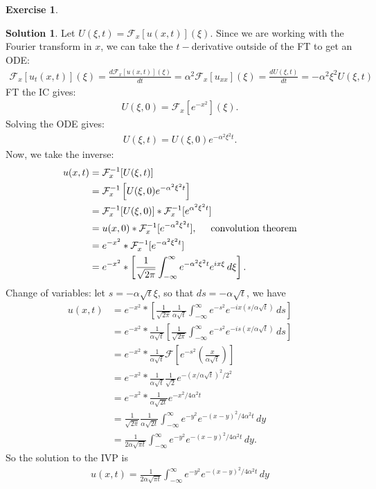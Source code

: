 \documentclass{book}
\theoremstyle{definition}
\newtheorem*{exer*}{Exercise}
\newtheorem*{sln*}{Solution}
\newcommand{\F}{\mathcal{F}}
\newcommand{\f}[2]{\frac{#1}{#2}}
\newcommand{\lp}{\left(}
\newcommand{\rp}{\right)}
\newcommand{\lb}{\left[}
\newcommand{\rb}{\right]}
\begin{document}
\begin{exer*}
\begin{sln*}
		Let $U(\xi, t) = \F_x[u(x,t)](\xi)$. Since we are working with the Fourier transform in $x$, we can take the $t-$derivative outside of the FT to get an ODE:
		\begin{align*}
		\F_x[u_t(x,t)](\xi) = \f{d\F_x[u(x,t)](\xi)}{dt} = \alpha^2 \F_x[u_{xx}](\xi) =\boxed{\f{dU(\xi,t)}{dt} = -\alpha^2 \xi^2 U(\xi, t)}
		\end{align*}
		FT the IC gives:
		\begin{align*}
		U(\xi, 0) = \F_x\lb e^{-x^2} \rb(\xi).
		\end{align*}
		Solving the ODE gives:
		\begin{align*}
		U(\xi, t) = U(\xi, 0)e^{-\alpha^2 \xi^2 t}.
		\end{align*}
		Now, we take the inverse:
		\begin{align*}
		u(x,t) &= \F_x^{-1}[U(\xi,t)] \\
		&= \F_x^{-1}\lb U(\xi, 0)e^{-\alpha^2 \xi^2 t}\rb \\
		&= \F_x^{-1}[U(\xi,0)] \ast \F^{-1}_x[e^{\alpha^2 \xi^2 t}]\\
		&= u(x,0) \ast \F^{-1}_x[e^{-\alpha^2 \xi^2 t}], \hspace{0.5cm} \text{convolution theorem}\\
		&= e^{-x^2} \ast \F^{-1}_x[e^{-\alpha^2 \xi^2 t}]\\
		&= e^{-x^2} \ast \lb \f{1}{\sqrt{2\pi}}  \int^\infty_{-\infty} e^{-\alpha^2 \xi^2 t}e^{ix\xi}\,d\xi \rb.
		\end{align*}
		Change of variables: let $s = -\alpha \sqrt{t} \xi$, so that $ds = -\alpha \sqrt{t}$, we have
		\begin{align*}
		u(x,t) &= e^{-x^2} \ast \lb \f{1}{\sqrt{2\pi}}  \f{1}{\alpha\sqrt{t}} \int^\infty_{-\infty} e^{-s^2}e^{-ix(s/\alpha\sqrt{t})}\,ds \rb\\
		&= e^{-x^2}\ast \f{1}{\alpha\sqrt{t}}\lb \f{1}{\sqrt{2\pi}}\int^\infty_{-\infty}e^{-s^2}e^{-is(x/\alpha\sqrt{t})}\,ds   \rb\\
		&= e^{-x^2} \ast \f{1}{\alpha\sqrt{t}} \F[e^{-s^2}\lp \f{x}{\alpha \sqrt{t}} \rp] \\
		&= e^{-x^2} \ast \f{1}{\alpha\sqrt{t}} \f{1}{\sqrt{2}}e^{-(x/\alpha \sqrt{t})^2 / 2^2}\\
		&= e^{-x^2} \ast \f{1}{\alpha\sqrt{2t}}e^{-x^2/4\alpha^2 t}\\
		&= \f{1}{\sqrt{2\pi}}\f{1}{\alpha\sqrt{2t}}\int^\infty_{-\infty} e^{-y^2}e^{-(x-y)^2/4\alpha^2 t}\,dy\\
		&= \f{1}{2\alpha\sqrt{\pi t}} \int^\infty_{-\infty} e^{-y^2}e^{-(x-y)^2/4\alpha^2 t}\,dy.
		\end{align*}
		So the solution to the IVP is
		\begin{align*}
		\boxed{u(x,t) = \f{1}{2\alpha\sqrt{\pi t}} \int^\infty_{-\infty} e^{-y^2}e^{-(x-y)^2/4\alpha^2 t}\,dy}
		\end{align*}
		
		
		
	\end{sln*}
\end{exer*}
\end{document}
